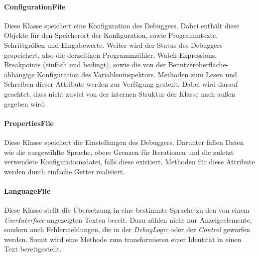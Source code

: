 \documentclass[parskip=full]{scrartcl}
\begin{document}
\paragraph{ConfigurationFile}
Diese Klasse speichert eine Konfiguration des Debuggers.
Dabei enthält diese Objekte für den Speicherort der Konfiguration, sowie Programmtexte, Schrittgrößen und Eingabewerte.
Weiter wird der Status des Debuggers gespeichert, also die derzeitigen Programmzähler, Watch-Expressions, Breakpoints (einfach und bedingt), sowie die von der Benutzeroberfläche-abhängige Konfiguration des Variableninspektors.
Methoden zum Lesen und Schreiben dieser Attribute werden zur Verfügung gestellt. Dabei wird darauf geachtet, dass nicht zuviel von der internen Struktur der Klasse nach außen gegeben wird.
\paragraph{PropertiesFile}
Diese Klasse speichert die Einstellungen des Debuggers.
Darunter fallen Daten wie die ausgewählte Sprache, obere Grenzen für Iterationen und die zuletzt verwendete Konfigurationsdatei, falls diese existiert.
Methoden für diese Attribute werden durch einfache Getter realisiert.
\paragraph{LanguageFile}
Diese Klasse stellt die Übersetzung in eine bestimmte Sprache zu den von einem \textit{UserInterface} angezeigten Texten bereit.
Dazu zählen nicht nur Anzeigeelemente, sondern auch Fehlermeldungen, die in der \textit{DebugLogic} oder der \textit{Control} geworfen werden.
Somit wird eine Methode zum transformieren einer Identität in einen Text bereitgestellt.
\end{document}
